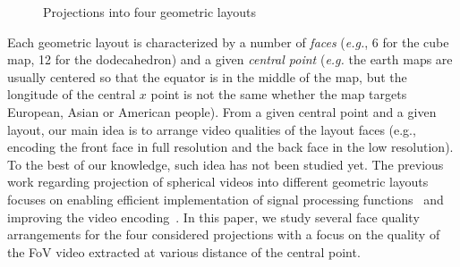 \begin{figure}[t]
\centering
{}
\caption{Projections into four geometric layouts}\label{fig:mapping}
\end{figure}

Each geometric layout is characterized by a number of \emph{faces} (\textit{e.g.}, 6 for 
the cube map, 12 for the dodecahedron) and a given \emph{central point} (\textit{e.g.} the earth 
maps are usually centered so that the equator is in the middle of the map, but the longitude 
of the central $x$ point is not the same whether the map targets European, Asian or American 
people).
From a given central point and a given layout, our main idea is to arrange video qualities of 
the layout faces (e.g., encoding the front face in full resolution and the back face in 
the low resolution). 
To the best of our knowledge, such idea has not been studied yet.
The previous work regarding projection of spherical videos into different
geometric layouts focuses on enabling efficient implementation of signal processing
functions~\cite{kazhdan_metric-aware_2010} and improving the video
encoding~\cite{tosic_low_2009}. In this paper, we study several face quality arrangements
for the four considered projections with a focus on the quality of the FoV video extracted at 
various 
distance of the central point.

